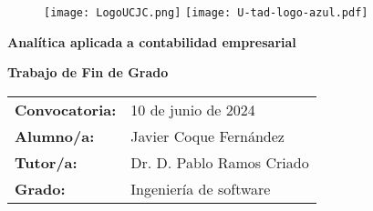 \thispagestyle{empty}


\phantom{xxxx}
\vspace{-2.0cm}
\begin{figure}
		\hspace{1cm}\texttt{[image: LogoUCJC.png]} \hspace{3cm}
		\texttt{[image: U-tad-logo-azul.pdf]} \\[3.4cm]
\end{figure}


\begin{center}

{\Huge {\textbf{Analítica aplicada}}}
\vspace{0.20cm}
{\Huge {\textbf{a contabilidad empresarial}}}
\end{center}


\begin{center}
{\Huge {\textbf{Trabajo de Fin de Grado}}}
\end{center}


\renewcommand{\arraystretch}{1.5}

\begin{longtable}{l p{13.7cm}}
	{\Large \textbf{Convocatoria: }} & {\Large 10 de junio de 2024}\\[0.3cm]
{\Large \textbf{Alumno/a: }}& {\Large Javier Coque Fernández} \\[0.3cm]
	{\Large \textbf{Tutor/a: }}  & {\Large Dr. D. Pablo Ramos Criado} \\[0.3cm]
	{\Large \textbf{Grado: }} & {\Large Ingeniería de software} \\
\end{longtable}





